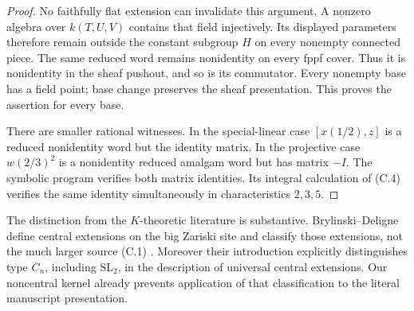 \begin{proof}
No faithfully flat extension can invalidate this argument. A nonzero
algebra over $k(T,U,V)$ contains that field injectively. Its displayed
parameters therefore remain outside the constant subgroup $H$ on
every nonempty connected piece. The same reduced word remains
nonidentity on every fppf cover. Thus it is nonidentity in the sheaf
pushout, and so is its commutator. Every nonempty base has a field
point; base change preserves the sheaf presentation. This proves the
assertion for every base.

There are smaller rational witnesses. In the special-linear case
$[x(1/2),z]$ is a reduced nonidentity word but the identity matrix.
In the projective case $w(2/3)^2$ is a nonidentity reduced amalgam
word but has matrix $-I$. The symbolic program verifies both matrix
identities. Its integral calculation of (C.4) verifies the same
identity simultaneously in characteristics $2,3,5$.
\end{proof}

The distinction from the $K$-theoretic literature is substantive.
Brylinski--Deligne define central extensions on the big Zariski site
and classify those extensions, not the much larger source (C.1)
\cite[Introduction and Theorem 7.2]{BrylinskiDeligne2001C}.
Moreover their introduction explicitly distinguishes type $C_n$,
including $\mathrm{SL}_2$, in the description of universal central
extensions. Our noncentral kernel already prevents application of
that classification to the literal manuscript presentation.

